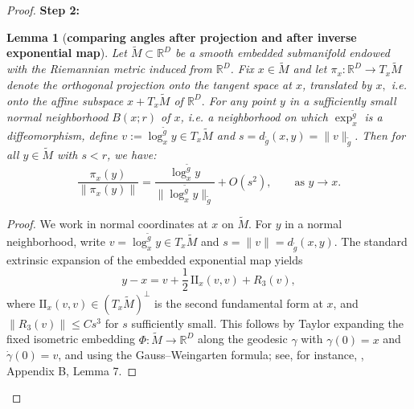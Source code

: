 \documentclass{amsart}
\let\oldcitet\citet
\renewcommand{\citet}[1]{\textcolor{blue}{\oldcitet{#1}}}
\newtheorem{lemma}[theorem]{Lemma}
\theoremstyle{definition}
\theoremstyle{remark}
\newcommand{\nd}{\noindent}
\newcommand{\Ddim}{\mathbb{R}^D}
\newcommand{\0}{\boldsymbol{0}}
\begin{document}
\begin{proof}
\nd \textbf{Step 2:}

\begin{lemma}[\textbf{comparing angles after projection and after inverse exponential map}]\label{lem:comparing projection and log}
Let $\widetilde{M} \subset \mathbb{R}^D$ be a smooth embedded submanifold endowed with the Riemannian metric induced from $\mathbb{R}^D$. 
Fix $x \in \widetilde{M}$ and let $\pi_x : \mathbb{R}^D \to T_x\widetilde{M}$ denote the orthogonal projection onto the tangent space at $x$, translated by $x,$ i.e. onto the affine subspace $x+T_x\widetilde{M}$ of $\Ddim.$
For any point $y$ in a sufficiently small normal neighborhood $B(x;r)$ of $x$, i.e. a neighborhood on which $\exp_x^{\tilde g}$ is a diffeomorphism, define $v:=\log_x^{\tilde g}y\in T_x\widetilde M$ and $s=d_{\tilde g}(x,y)=\|v\|_{\tilde g}$.
Then for all $y \in \widetilde{M}$ with $s < r$, we have:
\[
\frac{\pi_x(y)}{\|\pi_x(y)\|}
=\frac{\log_x^{\tilde g}y}{\|\log_x^{\tilde g}y\|_{\tilde g}}
+O(s^{2}),
\qquad \text{as } y \to x.
\]

\end{lemma}

\begin{proof}
    
We work in normal coordinates at $x$ on $\widetilde{M}$. For $y$ in a normal neighborhood, write
$v=\log_x^{\tilde g}y\in T_x\widetilde{M}$ and $s=\|v\|=d_{\tilde g}(x,y)$. 
The standard extrinsic expansion of the embedded exponential map yields
\[
y-x=v+\frac12\,\mathrm{II}_x(v,v)+R_3(v),
\]
where $\mathrm{II}_x(v,v)\in (T_x\widetilde M)^\perp$ is the second fundamental form at $x$, and $\|R_3(v)\|\le Cs^3$ for $s$ sufficiently small. This follows by Taylor expanding the fixed isometric embedding $\Phi:\widetilde M\to\mathbb R^D$ along the geodesic $\gamma$ with $\gamma(0)=x$ and $\dot\gamma(0)=v$, and using the Gauss--Weingarten formula; see, for instance, \citet{CoifmanLafon2006}, Appendix B, Lemma 7.





\end{proof}
\end{proof}
\end{document}
